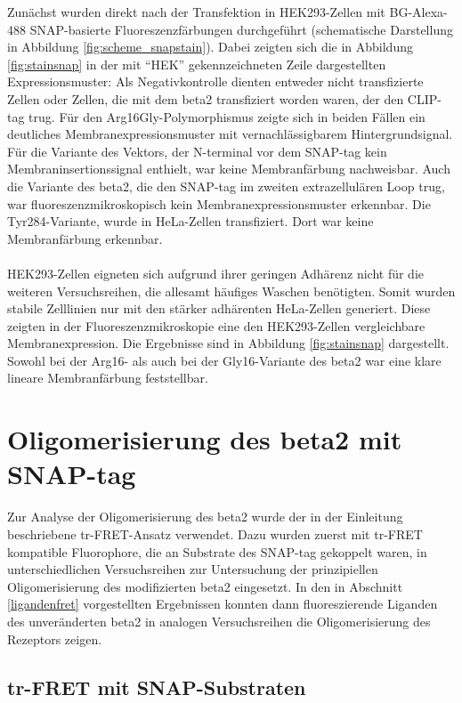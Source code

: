 Zunächst wurden direkt nach der Transfektion in HEK293-Zellen mit BG-Alexa-488 SNAP-basierte Fluoreszenzfärbungen durchgeführt (schematische Darstellung in Abbildung \ref{fig:scheme_snapstain}). Dabei zeigten sich die in Abbildung \ref{fig:stainsnap} in der mit "`HEK"' gekennzeichneten Zeile dargestellten Expressionsmuster: Als Negativkontrolle dienten entweder nicht transfizierte Zellen oder Zellen, die mit dem \gls{beta2} transfiziert worden waren, der den CLIP-tag trug. Für den Arg16Gly-Polymorphismus zeigte sich in beiden Fällen ein deutliches Membranexpressionsmuster mit vernachlässigbarem Hintergrundsignal. Für die Variante des Vektors, der N-terminal vor dem SNAP-tag kein Membraninsertionssignal enthielt, war keine Membranfärbung nachweisbar. Auch die Variante des \gls{beta2}, die den SNAP-tag im zweiten extrazellulären Loop trug, war fluoreszenzmikroskopisch kein Membranexpressionsmuster erkennbar. Die Tyr284-Variante, wurde in HeLa-Zellen transfiziert. Dort war keine Membranfärbung erkennbar.
\\ \\
HEK293-Zellen eigneten sich aufgrund ihrer geringen Adhärenz nicht für die weiteren Versuchsreihen, die allesamt häufiges Waschen benötigten. Somit wurden stabile Zelllinien nur mit den stärker adhärenten HeLa-Zellen generiert. Diese zeigten in der Fluoreszenzmikroskopie eine den HEK293-Zellen vergleichbare Membranexpression. Die Ergebnisse sind in Abbildung \ref{fig:stainsnap} dargestellt. Sowohl bei der Arg16- als auch bei der Gly16-Variante des \gls{beta2} war eine klare lineare Membranfärbung feststellbar.

\section{Oligomerisierung des \gls{beta2} mit SNAP-tag}
Zur Analyse der Oligomerisierung des \gls{beta2} wurde der in der Einleitung beschriebene tr-FRET-Ansatz verwendet. Dazu wurden zuerst mit tr-FRET kompatible Fluorophore, die an Substrate des SNAP-tag gekoppelt waren, in unterschiedlichen Versuchsreihen zur Untersuchung der prinzipiellen Oligomerisierung des modifizierten \gls{beta2} eingesetzt. In den in Abschnitt \ref{ligandenfret} vorgestellten Ergebnissen konnten dann fluoreszierende Liganden des unveränderten \gls{beta2} in analogen Versuchsreihen die Oligomerisierung des Rezeptors zeigen.

\subsection{tr-FRET mit SNAP-Substraten}

